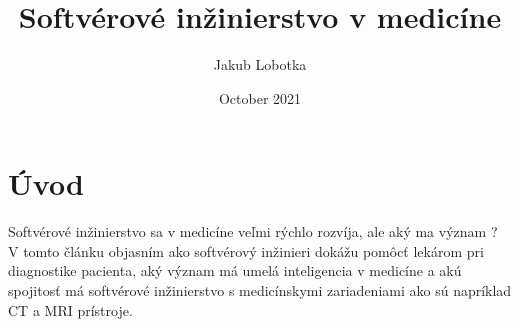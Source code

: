 \documentclass{article}
\title{Softvérové inžinierstvo v medicíne}
\author{Jakub Lobotka}
\date{October 2021}
\begin{document}
\maketitle

\section{Úvod}
Softvérové inžinierstvo sa v medicíne veľmi rýchlo rozvíja, ale aký ma význam ? V tomto článku objasním ako softvérový inžinieri dokážu pomôcť lekárom pri diagnostike pacienta, aký význam má umelá inteligencia v medicíne a akú spojitosť má softvérové inžinierstvo s medicínskymi zariadeniami ako sú napríklad CT a MRI prístroje.
\end{document}
